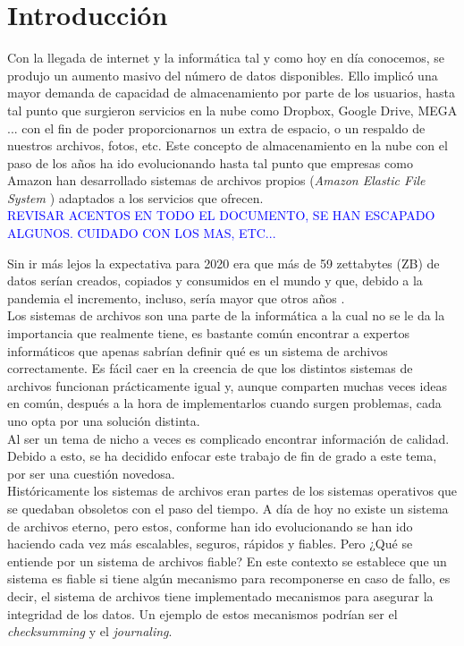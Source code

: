 \cleardoublepage
\clearpage{}

\chapter{Introducción}
Con la llegada de internet y la informática tal y como hoy en día conocemos, se produjo un aumento masivo del número de datos disponibles. Ello implicó una mayor demanda de capacidad de almacenamiento por parte de los usuarios, hasta tal punto que surgieron servicios en la nube como Dropbox, Google Drive, MEGA ... con el fin de poder proporcionarnos un extra de espacio, o un respaldo de nuestros archivos, fotos, etc. Este concepto de almacenamiento en la nube con el paso de los años ha ido evolucionando hasta tal punto que empresas como Amazon han desarrollado sistemas de archivos propios (\textit{Amazon Elastic File System} \cite{amazon})  adaptados a los servicios que ofrecen.\\

\textcolor{blue}{REVISAR ACENTOS EN TODO EL DOCUMENTO, SE HAN ESCAPADO ALGUNOS. CUIDADO CON LOS MAS, ETC...}


Sin ir más lejos la expectativa para 2020 era que más de 59 zettabytes (ZB) de datos serían creados, copiados y consumidos en el mundo y que, debido a la pandemia el incremento, incluso, sería mayor que otros años \cite{icb}. \\



Los sistemas de archivos son una parte de la informática a la cual no se le da la importancia que realmente tiene, es bastante común encontrar a expertos informáticos que apenas sabrían definir qué es un sistema de archivos correctamente. Es fácil caer en la creencia de que los distintos sistemas de archivos funcionan prácticamente igual y, aunque comparten muchas veces ideas en común, después a la hora de implementarlos cuando surgen problemas, cada uno opta por una solución distinta.\\

Al ser un tema de nicho a veces es complicado encontrar información de calidad. Debido a esto, se ha decidido enfocar este trabajo de fin de grado a este tema, por ser una cuestión novedosa.\\


Históricamente los sistemas de archivos eran partes de los sistemas operativos que se quedaban obsoletos con el paso del tiempo. A día de hoy no existe un sistema de archivos eterno, pero estos, conforme han ido evolucionando se han ido haciendo cada vez más escalables, seguros, rápidos y fiables. Pero ¿Qué se entiende por un sistema de archivos fiable? En este contexto se establece que un sistema es fiable si tiene algún mecanismo para recomponerse en caso de fallo, es decir, el sistema de archivos tiene implementado mecanismos para asegurar la integridad de los datos. Un ejemplo de estos mecanismos podrían ser el \textit{checksumming} y el \textit{journaling}.\\


